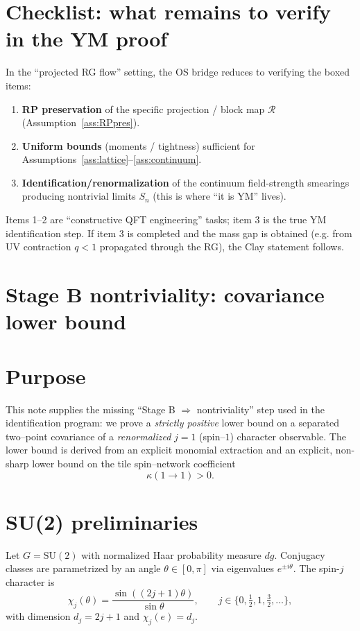 \documentclass[11pt]{article}
\theoremstyle{definition}
\newcommand{\1}{\mathbf{1}}
\begin{document}
\section{Checklist: what remains to verify in the YM proof}

In the ``projected RG flow'' setting, the OS bridge reduces to verifying the boxed items:
\begin{enumerate}[label=\fbox{\arabic*},leftmargin=3em]
\item \textbf{RP preservation} of the specific projection / block map \(\mathcal{R}\) (Assumption~\ref{ass:RPpres}).
\item \textbf{Uniform bounds} (moments / tightness) sufficient for Assumptions~\ref{ass:lattice}--\ref{ass:continuum}.
\item \textbf{Identification/renormalization} of the continuum field-strength smearings producing nontrivial limits \(S_n\) (this is where ``it is YM'' lives).
\end{enumerate}

Items 1--2 are ``constructive QFT engineering'' tasks; item 3 is the true YM identification step. If item 3 is completed and the mass gap is obtained (e.g. from UV contraction \(q<1\) propagated through the RG), the Clay statement follows.

\section{Stage B nontriviality: covariance lower bound}\label{sec:stageb}
\section{Purpose}
This note supplies the missing ``Stage B $\Rightarrow$ nontriviality'' step used in the identification program: we prove a \emph{strictly positive} lower bound on a separated two--point covariance of a \emph{renormalized} $j=1$ (spin--$1$) character observable. The lower bound is derived from an explicit monomial extraction and an explicit, non-sharp lower bound on the tile spin--network coefficient
\[
\kappa(1\to 1)>0.
\]

\section{SU(2) preliminaries}
Let $G=\mathrm{SU}(2)$ with normalized Haar probability measure $dg$. Conjugacy classes are parametrized by an angle $\theta\in[0,\pi]$ via eigenvalues $e^{\pm i\theta}$. The spin-$j$ character is
\[
\chi_j(\theta)=\frac{\sin((2j+1)\theta)}{\sin\theta},\qquad j\in\{0,\tfrac12,1,\tfrac32,\dots\},
\]
with dimension $d_j=2j+1$ and $\chi_j(e)=d_j$.
\end{document}

